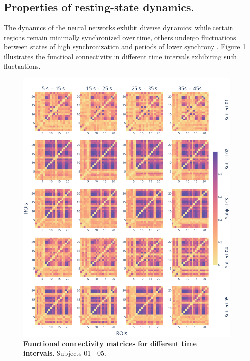 \documentclass[../main.tex]{subfiles}
\begin{document}
\subsection{Properties of resting-state dynamics.}
The dynamics of the neural networks exhibit diverse dynamics: while certain regions remain minimally synchronized over time, others undergo fluctuations between states of high synchronization and periods of lower synchrony \citep{battaglia_temporal_2007,lachaux1999measuring,doi:10.1089/brain.2015.0362}.
Figure \ref{fig:plv_dynamics} illustrates the functioal connectivity in different time intervals exhibiting such fluctuations.
\begin{figure}[htbp]
    \centering
    \includegraphics[width=\textwidth]{chapter3/figures/plv_dynamics_0.png}
    \caption{\textbf{Functional connectivity matrices for different time intervals}.
    Subjects 01 - 05.}
    \label{fig:plv_dynamics}
\end{figure}
\end{document}
